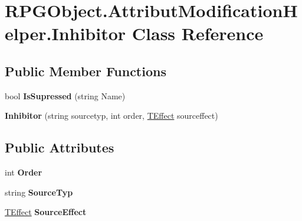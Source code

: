\hypertarget{class_r_p_g_object_1_1_attribut_modification_helper_1_1_inhibitor}{}\section{R\+P\+G\+Object.\+Attribut\+Modification\+Helper.\+Inhibitor Class Reference}
\label{class_r_p_g_object_1_1_attribut_modification_helper_1_1_inhibitor}
\subsection*{Public Member Functions}
\begin{DoxyCompactItemize}
\item 
\hypertarget{class_r_p_g_object_1_1_attribut_modification_helper_1_1_inhibitor_a9ead375ce3150b3b12f08b5e4a2e602f}{}bool {\bfseries Is\+Supressed} (string Name)\label{class_r_p_g_object_1_1_attribut_modification_helper_1_1_inhibitor_a9ead375ce3150b3b12f08b5e4a2e602f}

\item 
\hypertarget{class_r_p_g_object_1_1_attribut_modification_helper_1_1_inhibitor_ab804cf735fc66c0925e3d7cc5ed14fe3}{}{\bfseries Inhibitor} (string sourcetyp, int order, \hyperlink{class_t_effect}{T\+Effect} sourceffect)\label{class_r_p_g_object_1_1_attribut_modification_helper_1_1_inhibitor_ab804cf735fc66c0925e3d7cc5ed14fe3}

\end{DoxyCompactItemize}
\subsection*{Public Attributes}
\begin{DoxyCompactItemize}
\item 
\hypertarget{class_r_p_g_object_1_1_attribut_modification_helper_1_1_inhibitor_a7f9bd8077abc15c17733da40d3e9b552}{}int {\bfseries Order}\label{class_r_p_g_object_1_1_attribut_modification_helper_1_1_inhibitor_a7f9bd8077abc15c17733da40d3e9b552}

\item 
\hypertarget{class_r_p_g_object_1_1_attribut_modification_helper_1_1_inhibitor_a69ac088f734412ea446126566558599f}{}string {\bfseries Source\+Typ}\label{class_r_p_g_object_1_1_attribut_modification_helper_1_1_inhibitor_a69ac088f734412ea446126566558599f}

\item 
\hypertarget{class_r_p_g_object_1_1_attribut_modification_helper_1_1_inhibitor_a121e1d2d77017af1a8cd50eea75a16b9}{}\hyperlink{class_t_effect}{T\+Effect} {\bfseries Source\+Effect}\label{class_r_p_g_object_1_1_attribut_modification_helper_1_1_inhibitor_a121e1d2d77017af1a8cd50eea75a16b9}

\end{DoxyCompactItemize}


